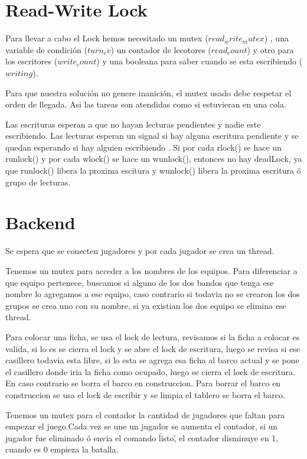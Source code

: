 \documentclass[a4paper]{article}
\begin{document}

\maketitle
\thispagestyle{empty}

\newpage
\tableofcontents

\newpage
\section{Read-Write Lock}
Para llevar a cabo el Lock hemos necesitado un mutex ($read_write_mutex$) , una variable de condición ($turn_cv$) un contador de lecotores ($read_count$) y otro para los escritores ($write_count$) y una booleana para saber cuando se esta escribiendo ($writing$).

Para que nuestra solución no genere inanición, el mutex usado debe respetar el orden de llegada. Asi las tareas son atendidas como si estuvieran en una cola.

Las escrituras esperan a que no hayan lecturas pendientes y nadie este escribiendo. Las lecturas esperan un signal si hay alguna escritura pendiente y se quedan esperando si hay alguien escribiendo .
Si por cada rlock() se hace un  runlock() y por cada wlock() se hace un wunlock(), entonces no hay deadLock, ya que runlock() libera la proxima escitura y wunlock() libera la proxima escritura ó grupo de lecturas.


\section{Backend}
Se espera que se conecten jugadores y por cada jugador se crea un thread.

Tenemos un mutex para acceder a los nombres de los equipos. Para diferenciar a que equipo pertenece,  buscamos si alguno de los dos bandos que tenga ese nombre lo agregamos a ese equipo, caso contrario si todavia no se crearon los dos grupos se crea uno con su nombre, si ya existian los dos equipo se elimina ese thread.

Para colocar una ficha, se usa el lock de lectura, revisamos si la ficha a colocar es valida, si lo es se cierra el lock y se abre el lock de escritura, luego se revisa si ese casillero todavia esta libre, si lo esta se agrega esa ficha al barco actual y se pone el casillero donde iria la ficha como ocupado, luego se cierra el lock de escritura. En caso contrario se borra el barco en construccion.
Para borrar el barco en construccion se usa el lock de escribir y se limpia el tablero se borra el barco.

Tenemos un mutex para el contador la cantidad de jugadores que faltan para empezar el juego.Cada vez se une un jugador se aumenta el contador, si un jugador fue eliminado ó envia el comando \'listo\', el contador disminuye en 1, cuando  es $0$ empieza la batalla.
\end{document}
